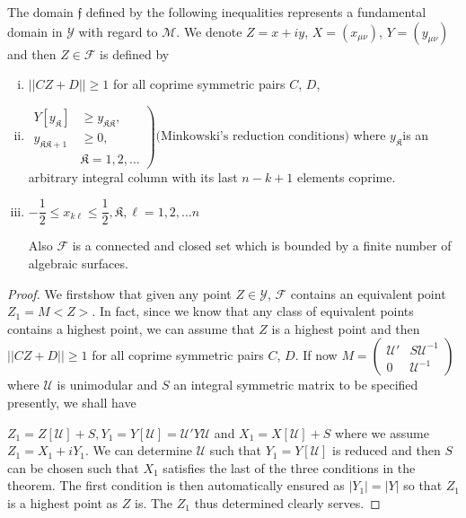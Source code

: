 \setcounter{thm}{2}
\begin{thm}\label{chap4:thm3}%
 The domain $\mathfrak{f}$ defined by the following inequalities
  represents a fundamental domain in $\mathscr{Y}$ with regard to
  $\mathcal{M}$. We denote $Z = x + i y$, $X = (x_{\mu
  \nu})$, $Y=(y_{\mu \nu})$ and then $Z \in \mathcal{F}$ is
defined by  
\begin{enumerate}[(i)]
\item $|| CZ +D || \geq 1$ for all coprime symmetric pairs $C$, $D$, 

\item $\left.
\begin{aligned} 
 Y [y_\mathfrak{K}] & \geq y_{\mathfrak{K} \mathfrak{K}},\\
y_{\mathfrak{K} \mathfrak{K}+1} & \geq 0,\\
& \mathfrak{K} =1,2, \ldots
\end{aligned}
\right)
\text{(Minkowski's reduction conditions)}
$
where $y_\mathfrak{K}$\break is an arbitrary integral column
  with its last $n-k+1$ elements coprime. 

\item $- \dfrac{1}{2} \leq x_{k \ell } \leq \dfrac{1}{2},
  \mathfrak{K},\ell =1,2, \ldots n$ 

Also $\mathcal{F}$ is a connected and closed set which is 
  bounded by a finite number of algebraic surfaces. 
\end{enumerate}
\end{thm}

\begin{proof}
We first\pageoriginale show that given any point $Z \in \mathscr{Y}$,
$\mathcal{F}$ 
contains an equivalent point $Z_1=M < Z >$. In fact, since we know
that any class of equivalent points contains a highest point, we can
assume that $Z$ is a highest point and then $|| CZ+D|| \geq 1$ for all
coprime symmetric pairs $C$, $D$. If now $M= \begin{pmatrix}\mathcal{U'}
  & S \mathcal{U}^{-1}\\0 & \mathcal{U}^{-1} \end{pmatrix}$ where
$\mathcal{U}$ is unimodular and $S$ an integral symmetric matrix to be
specified presently, we shall have  

$Z_1=Z[\mathcal{U}] + S, Y_1 = Y[\mathcal{U}] = \mathcal{U'}Y
\mathcal{U}$ and $X_1 = X [\mathcal{U}] + S$ where we assume $Z_1=X_1
+ i Y_1$. We can determine $\mathcal{U}$ such that
$Y_1=Y[\mathcal{U}]$ is reduced and then $S$ can be chosen such that
$X_1$ satisfies the last of the three conditions in the theorem. The
first condition is then automatically ensured as $| Y_1| = |Y|$ so
that $Z_1$ is a highest point as $Z$ is. The $Z_1$ thus determined
clearly serves. 
\end{proof} 	 

